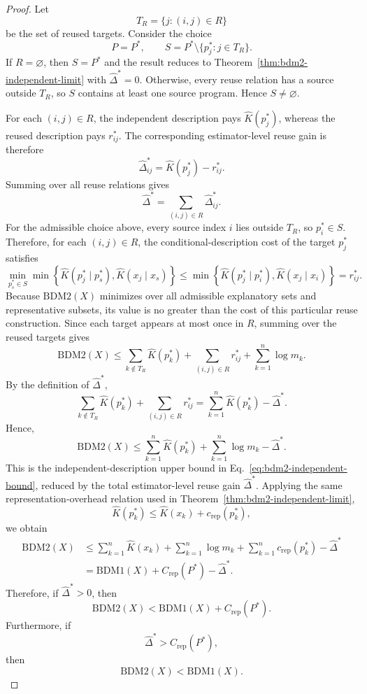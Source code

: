 \documentclass[10pt,a4paper]{amsart}
\begin{document}
\begin{proof}
Let
\[
T_R
=
\{j:(i,j)\in R\}
\]
be the set of reused targets. Consider the choice
\[
P=P^*,
\qquad
S
=
P^*
\setminus
\{p_j^*:j\in T_R\}.
\]
If \(R=\varnothing\), then \(S=P^*\) and the result reduces to Theorem~\ref{thm:bdm2-independent-limit} with \(\hat{\Delta}^*=0\). Otherwise, every reuse relation has a source outside \(T_R\), so \(S\) contains at least one source program. Hence \(S\neq\varnothing\).

For each \((i,j)\in R\), the independent description pays \(\hat K(p_j^*)\), whereas the reused description pays \(r_{ij}^*\). The corresponding estimator-level reuse gain is therefore
\[
\hat{\Delta}_{ij}^*
=
\hat K(p_j^*)-r_{ij}^*.
\]
Summing over all reuse relations gives
\[
\hat{\Delta}^*
=
\sum_{(i,j)\in R}
\hat{\Delta}_{ij}^*.
\]
For the admissible choice above, every source index \(i\) lies outside \(T_R\), so \(p_i^*\in S\). Therefore, for each \((i,j)\in R\), the conditional-description cost of the target \(p_j^*\) satisfies
\[
\min_{p_s^*\in S}
\min
\left\{
\hat K(p_j^*\mid p_s^*),
\hat K(x_j\mid x_s)
\right\}
\leq
\min
\left\{
\hat K(p_j^*\mid p_i^*),
\hat K(x_j\mid x_i)
\right\}
=
r_{ij}^*.
\]
Because \(\mathrm{BDM2}(X)\) minimizes over all admissible explanatory sets and representative subsets, its value is no greater than the cost of this particular reuse construction. Since each target appears at most once in \(R\), summing over the reused targets gives
\[
\mathrm{BDM2}(X)
\leq
\sum_{k\notin T_R}\hat K(p_k^*)
+
\sum_{(i,j)\in R}r_{ij}^*
+
\sum_{k=1}^{n}\log m_k.
\]
By the definition of \(\hat{\Delta}^*\),
\[
\sum_{k\notin T_R}\hat K(p_k^*)
+
\sum_{(i,j)\in R}r_{ij}^*
=
\sum_{k=1}^{n}\hat K(p_k^*)
-
\hat{\Delta}^*.
\]
Hence,
\[
\mathrm{BDM2}(X)
\leq
\sum_{k=1}^{n}\hat K(p_k^*)
+
\sum_{k=1}^{n}\log m_k
-
\hat{\Delta}^*.
\]
This is the independent-description upper bound in Eq.~\eqref{eq:bdm2-independent-bound}, reduced by the total estimator-level reuse gain \(\hat{\Delta}^*\). Applying the same representation-overhead relation used in Theorem~\ref{thm:bdm2-independent-limit},
\[
\hat K(p_k^*)
\leq
\hat K(x_k)
+
c_{\mathrm{rep}}(p_k^*),
\]
we obtain
\[
\begin{aligned}
\mathrm{BDM2}(X)
&\leq
\sum_{k=1}^{n}\hat K(x_k)
+
\sum_{k=1}^{n}\log m_k
+
\sum_{k=1}^{n}c_{\mathrm{rep}}(p_k^*)
-
\hat{\Delta}^* \\
&=
\mathrm{BDM1}(X)
+
C_{\mathrm{rep}}(P^*)
-
\hat{\Delta}^*.
\end{aligned}
\]
Therefore, if \(\hat{\Delta}^*>0\), then
\[
\mathrm{BDM2}(X)
<
\mathrm{BDM1}(X)
+
C_{\mathrm{rep}}(P^*).
\]
Furthermore, if
\[
\hat{\Delta}^*
>
C_{\mathrm{rep}}(P^*),
\]
then
\[
\mathrm{BDM2}(X)
<
\mathrm{BDM1}(X).
\]
\end{proof}
\end{document}
